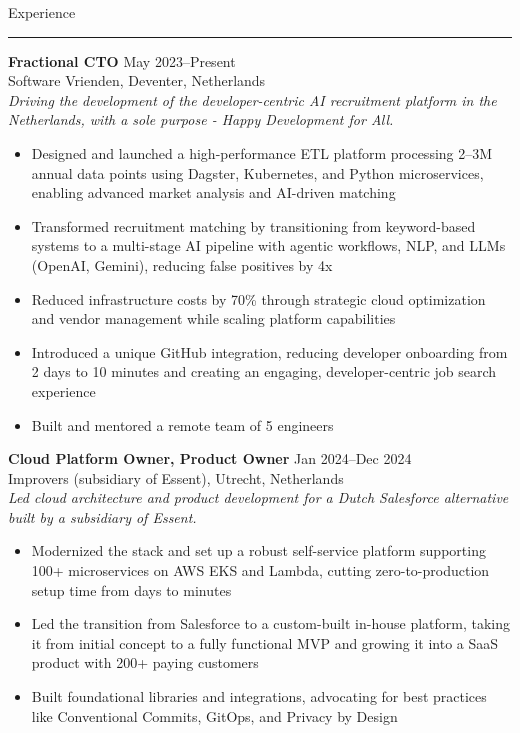 \documentclass[10pt,a4paper]{article}
\newcommand{\CVSection}[1]{%
  \vspace{8pt}%
  {\headingfont\textcolor{techBlue}{#1}}\\
  \rule{\linewidth}{0.5pt}%
  \vspace{4pt}%
}
\begin{document}
\vspace{1em}
\noindent
\begin{minipage}[t]{0.64\textwidth}
  \CVSection{Experience}

  {\textbf{Fractional CTO} \hfill May 2023--Present} \\
  Software Vrienden, Deventer, Netherlands \\
  \textit{Driving the development of the developer-centric AI recruitment platform in the Netherlands, with a sole purpose - Happy Development for All.}
  \begin{itemize}[leftmargin=*]
    \item Designed and launched a high-performance ETL platform processing 2--3M annual data points using Dagster, Kubernetes, and Python microservices, enabling advanced market analysis and AI-driven matching
    \item Transformed recruitment matching by transitioning from keyword-based systems to a multi-stage AI pipeline with agentic workflows, NLP, and LLMs (OpenAI, Gemini), reducing false positives by 4x
    \item Reduced infrastructure costs by 70\% through strategic cloud optimization and vendor management while scaling platform capabilities
    \item Introduced a unique GitHub integration, reducing developer onboarding from 2 days to 10 minutes and creating an engaging, developer-centric job search experience
    \item Built and mentored a remote team of 5 engineers
  \end{itemize}

  {\textbf{Cloud Platform Owner, Product Owner} \hfill Jan 2024--Dec 2024} \\
  Improvers (subsidiary of Essent), Utrecht, Netherlands \\
  \textit{Led cloud architecture and product development for a Dutch Salesforce alternative built by a subsidiary of Essent.}
  \begin{itemize}[leftmargin=*]
    \item Modernized the stack and set up a robust self-service platform supporting 100+ microservices on AWS EKS and Lambda, cutting zero-to-production setup time from days to minutes
    \item Led the transition from Salesforce to a custom-built in-house platform, taking it from initial concept to a fully functional MVP and growing it into a SaaS product with 200+ paying customers
    \item Built foundational libraries and integrations, advocating for best practices like Conventional Commits, GitOps, and Privacy by Design
  \end{itemize}


\end{minipage}
\end{document}
